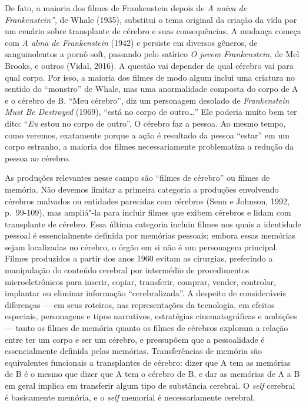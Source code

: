 De fato, a maioria dos filmes de Frankenstein depois de \emph{A noiva de
Frankenstein''}, de Whale (1935), substitui o tema original da criação
da vida por um cenário sobre transplante de cérebro e suas
consequências. A mudança começa com \emph{A alma de Frankenstein} (1942)
e persiste em diversos gêneros, de sanguinolentos a pornô soft, passando
pelo satírico \emph{O jovem Frankenstein}, de Mel Brooks, e outros
(Vidal, 2016). A questão vai depender de qual cérebro vai para qual
corpo. Por isso, a maioria dos filmes de modo algum inclui uma criatura
no sentido do ``monstro'' de Whale, mas uma anormalidade composta do
corpo de A e o cérebro de B. ``Meu cérebro'', diz um personagem desolado
de \emph{Frankenstein Must Be Destroyed} (1969), ``está no corpo de
outro\ldots{}'' Ele poderia muito bem ter dito: ``\emph{Eu} estou no corpo de
outro''. O cérebro faz a pessoa. Ao mesmo tempo, como veremos,
exatamente porque a ação é resultado da pessoa ``estar'' em um corpo
estranho, a maioria dos filmes necessariamente problematiza a redução da
pessoa ao cérebro.

As produções relevantes nesse campo são ``filmes de cérebro'' ou filmes
de memória. Não devemos limitar a primeira categoria a produções
envolvendo cérebros malvados ou entidades parecidas com cérebros (Senn e
Johnson, 1992, p.~99-109), mas ampliá"-la para incluir filmes que exibem
cérebros e lidam com transplante de cérebro. Essa última categoria
incluiu filmes nos quais a identidade pessoal é essencialmente definida
por memórias pessoais; embora essas memórias sejam localizadas no
cérebro, o órgão em si não é um personagem principal. Filmes produzidos
a partir dos anos 1960 evitam as cirurgias, preferindo a manipulação do
conteúdo cerebral por intermédio de procedimentos microeletrônicos para
inserir, copiar, transferir, comprar, vender, controlar, implantar ou
eliminar informação ``cerebralizada''. A despeito de consideráveis
diferenças --- em seus roteiros, nas representações da tecnologia, em
efeitos especiais, personagens e tipos narrativos, estratégias
cinematográficas e ambições --- tanto os filmes de memória quanto os
filmes de cérebros exploram a relação entre ter um corpo e ser um
cérebro, e pressupõem que a pessoalidade é essencialmente definida pelas
memórias. Transferências de memória são equivalentes funcionais a
transplantes de cérebro: dizer que A tem as memórias de B é o mesmo que
dizer que A tem o cérebro de B, e dar as memórias de A a B em geral
implica em transferir algum tipo de substância cerebral. O \emph{self} cerebral
é basicamente memória, e o \emph{self} memorial é necessariamente cerebral.

